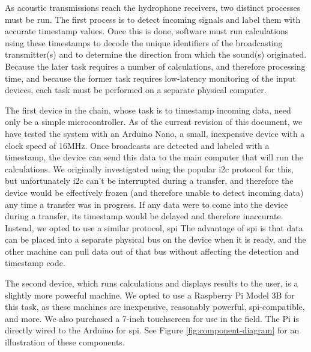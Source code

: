 \documentclass[12pt]{article}
\begin{document}
As acoustic transmissions reach the hydrophone receivers, two distinct
processes must be run.
The first process is to detect incoming signals and label them with accurate
timestamp values.
Once this is done, software must run calculations using these timestamps
to decode the unique identifiers of the broadcasting transmitter(s) and to
determine the direction from which the sound(s) originated.
Because the later task requires a number of calculations, and therefore
processing time,
and because the former task requires low-latency monitoring of the input
devices, each task must be performed on a separate physical computer.

The first device in the chain, whose task is to timestamp incoming data,
need only be a simple microcontroller.
As of the current revision of this document,
we have tested the system with an Arduino Nano, a small,
inexpensive device with a clock speed of 16MHz.
Once broadcasts are detected and labeled with a timestamp, the device can
send this data to the main computer that will run the calculations.
We originally investigated using the popular \gls{i2c} protocol for this, but
unfortunately \gls{i2c} can't be interrupted during a transfer, and therefore
the device would be effectively frozen (and therefore unable to detect
incoming data) any time a transfer was in progress.
If any data were to come into the device during a transfer, its timestamp
would be delayed and therefore inaccurate.
Instead, we opted to use a similar protocol, \gls{spi}
The advantage of \gls{spi} is that data can be placed into a separate physical
bus on the device when it is ready, and the other machine can pull data out
of that bus without affecting the detection and timestamp code.

The second device, which runs calculations and displays results to the user,
is a slightly more powerful machine.
We opted to use a Raspberry Pi Model 3B for this task, as these machines are
inexpensive, reasonably powerful, \gls{spi}-compatible, and more.
We also purchased a 7-inch touchscreen for use in the field.
The Pi is directly wired to the Arduino for \gls{spi}.
See Figure \ref{fig:component-diagram} for an illustration of these components.
\end{document}
